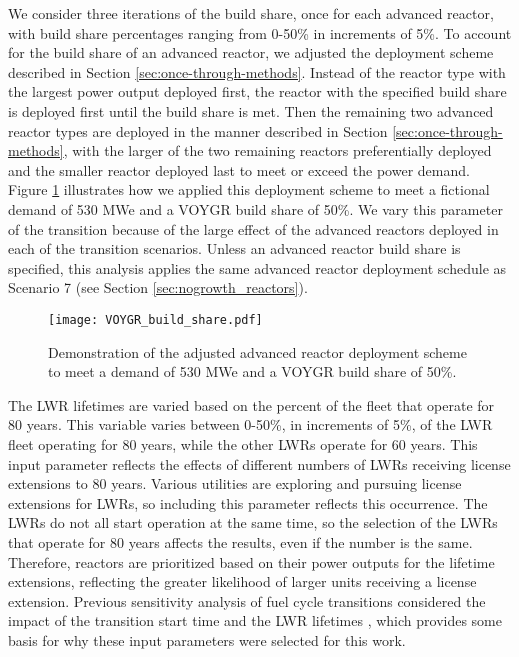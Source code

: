 We consider three 
iterations of the build share, once for each advanced reactor, with 
build share percentages ranging from 0-50\% 
in increments of 5\%. To account for the build share of an advanced reactor,
we adjusted the deployment scheme described in Section \ref{sec:once-through-methods}.
Instead of the reactor type with the largest power output 
deployed first, the reactor with the specified build share is deployed first 
until the build share is met. Then the remaining two advanced reactor types are 
deployed in the manner described in Section \ref{sec:once-through-methods},
with the larger of the two remaining reactors preferentially deployed and 
the smaller reactor deployed last to meet or exceed the power demand. Figure 
\ref{fig:build-share-deploy} illustrates how we applied this deployment 
scheme to meet a fictional demand of 530 MWe and a VOYGR build share of 
50\%. We vary this parameter of the transition because of the large effect 
of the advanced reactors deployed in each of the transition scenarios. 
Unless an advanced reactor build share is specified, this analysis 
applies the same advanced reactor deployment schedule as Scenario 7
(see Section \ref{sec:nogrowth_reactors}).

\begin{figure}
    \centering 
    \texttt{[image: VOYGR\_build\_share.pdf]}
    \caption{Demonstration of the adjusted advanced reactor deployment 
    scheme to meet a demand of 530 MWe and a VOYGR build share of 
    50\%.}
    \label{fig:build-share-deploy}
\end{figure}

The \gls{LWR} lifetimes are varied based 
on the percent of the fleet that operate for 80 years. This 
variable varies between 0-50\%, in increments of 5\%, of the \gls{LWR} 
fleet operating for 80 
years, while the other \glspl{LWR} operate for 60 years. This input 
parameter reflects the effects of different numbers of \glspl{LWR} 
receiving license extensions to 80 years. Various utilities are exploring 
and pursuing license extensions for \glspl{LWR}, so including this parameter 
reflects this occurrence. The 
\glspl{LWR} do not all start operation at the same time, so the 
selection of the \glspl{LWR} that operate for 80 years affects the results, 
even if the number is the same. Therefore, reactors are prioritized based 
on their power outputs for the lifetime extensions, reflecting the greater likelihood of 
larger units receiving a license extension. Previous sensitivity analysis of 
fuel cycle transitions considered the impact of the transition start time 
and the \gls{LWR} lifetimes \cite{chee_sensitivity_2019,feng_sensitivity_2020},
which provides some basis for why these input parameters were selected for this 
work.

